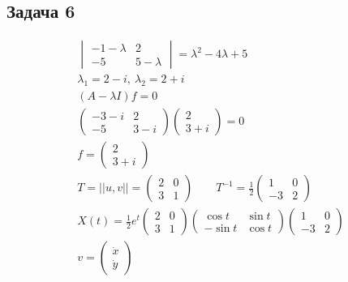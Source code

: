 \subsection*{Задача 6}
\begin{figure}[!h]
	\begin{minipage}[h]{0.49\linewidth}
		\begin{gather*}
			\begin{vmatrix}
				-1 - \lambda & 2\\
				-5 & 5 - \lambda
			\end{vmatrix}
			=
			\lambda^2 - 4\lambda + 5\\
			\lambda_1 = 2 - i,\ \lambda_2 = 2 + i\\
			\left(A - \lambda I\right)f = 0\\
			\begin{pmatrix}
				-3-i & 2\\
				-5 & 3-i
			\end{pmatrix}
			\begin{pmatrix}
				2 \\ 3+i
			\end{pmatrix}
			= 0\\
			f = 
			\begin{pmatrix}
				2 \\ 3+i
			\end{pmatrix}\\
			T = ||u,v|| =
			\begin{pmatrix}
				2 & 0\\
				3 & 1
			\end{pmatrix}\qquad
			T^{-1} = \frac{1}{2}
			\begin{pmatrix}
				1 & 0\\
				-3 & 2
			\end{pmatrix}\\
			X\left(t\right) = \frac{1}{2} e^{t}
			\begin{pmatrix}
				2 & 0\\
				3 & 1
			\end{pmatrix}
			\begin{pmatrix}
				\cos t & \sin t\\
				-\sin t & \cos t
			\end{pmatrix}
			\begin{pmatrix}
				1 & 0\\
				-3 & 2
			\end{pmatrix}\\
			v = 
			\begin{pmatrix}
				\dot{x} \\ \dot{y}

\end{pmatrix}
\end{gather*}
\end{minipage}
\end{figure}
